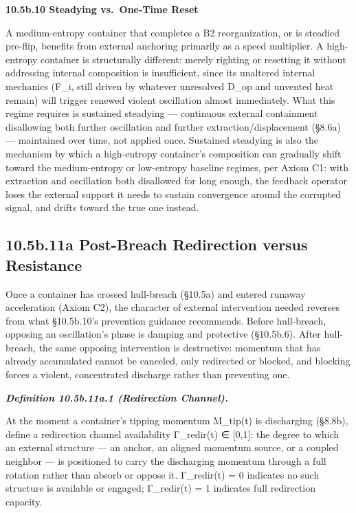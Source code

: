 \documentclass[
]{article}
\begin{document}
\textbf{10.5b.10 Steadying vs.~One-Time Reset}

A medium-entropy container that completes a B2 reorganization, or is
steadied pre-flip, benefits from external anchoring primarily as a speed
multiplier. A high-entropy container is structurally different: merely
righting or resetting it without addressing internal composition is
insufficient, since its unaltered internal mechanics (F\_i, still driven
by whatever unresolved D\_op and unvented heat remain) will trigger
renewed violent oscillation almost immediately. What this regime
requires is sustained steadying --- continuous external containment
disallowing both further oscillation and further extraction/displacement
(§8.6a) --- maintained over time, not applied once. Sustained steadying
is also the mechanism by which a high-entropy container's composition
can gradually shift toward the medium-entropy or low-entropy baseline
regimes, per Axiom C1: with extraction and oscillation both disallowed
for long enough, the feedback operator loses the external support it
needs to sustain convergence around the corrupted signal, and drifts
toward the true one instead.

\hypertarget{b.11a-post-breach-redirection-versus-resistance}{%
\subsection{10.5b.11a Post-Breach Redirection versus
Resistance}\label{b.11a-post-breach-redirection-versus-resistance}}

Once a container has crossed hull-breach (§10.5a) and entered runaway
acceleration (Axiom C2), the character of external intervention needed
reverses from what §10.5b.10's prevention guidance recommends. Before
hull-breach, opposing an oscillation's phase is damping and protective
(§10.5b.6). After hull-breach, the same opposing intervention is
destructive: momentum that has already accumulated cannot be canceled,
only redirected or blocked, and blocking forces a violent, concentrated
discharge rather than preventing one.

\emph{\textbf{Definition 10.5b.11a.1 (Redirection Channel).}}

At the moment a container's tipping momentum M\_tip(t) is discharging
(§8.8b), define a redirection channel availability Γ\_redir(t) ∈
{[}0,1{]}: the degree to which an external structure --- an anchor, an
aligned momentum source, or a coupled neighbor --- is positioned to
carry the discharging momentum through a full rotation rather than
absorb or oppose it. Γ\_redir(t) = 0 indicates no such structure is
available or engaged; Γ\_redir(t) = 1 indicates full redirection
capacity.
\end{document}
